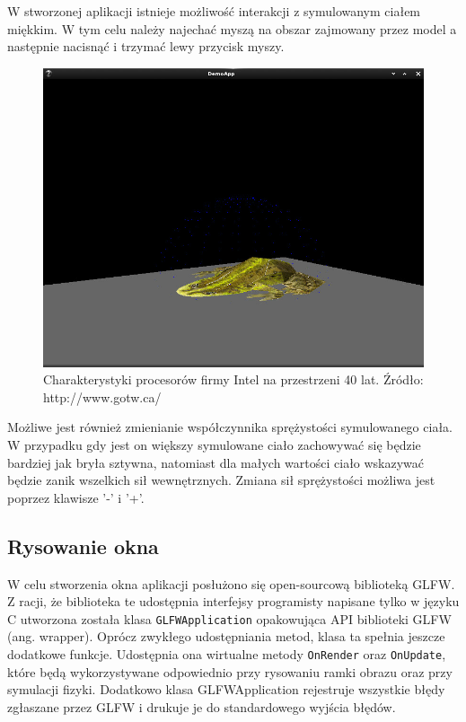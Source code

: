 W stworzonej aplikacji istnieje możliwość interakcji z symulowanym ciałem
miękkim. W tym celu należy najechać myszą na obszar zajmowany przez model a
następnie nacisnąć i trzymać lewy przycisk myszy.

\begin{figure}[H]
\centering
\includegraphics[scale=0.5]{images/z5.jpg}
\caption{Charakterystyki procesorów firmy Intel na przestrzeni 40 lat. Źródło: http://www.gotw.ca/}
\end{figure}

Możliwe jest również zmienianie współczynnika sprężystości symulowanego ciała. W
przypadku gdy jest on większy symulowane ciało zachowywać się będzie bardziej
jak bryła sztywna, natomiast dla małych wartości ciało wskazywać będzie zanik
wszelkich sił wewnętrznych. Zmiana sił sprężystości możliwa jest poprzez
klawisze '-' i '+'.

\subsection{Rysowanie okna}
W celu stworzenia okna aplikacji posłużono się open-sourcową biblioteką GLFW. Z
racji, że biblioteka te udostępnia interfejsy programisty napisane tylko w języku C
utworzona została klasa \texttt{GLFWApplication} opakowująca API biblioteki
GLFW (ang. wrapper). Oprócz zwykłego udostępniania metod, klasa ta spełnia
jeszcze dodatkowe funkcje. Udostępnia ona wirtualne metody \texttt{OnRender}
oraz \texttt{OnUpdate}, które będą wykorzystywane odpowiednio przy rysowaniu
ramki obrazu oraz przy symulacji fizyki. Dodatkowo klasa GLFWApplication rejestruje wszystkie błędy zgłaszane przez
GLFW i drukuje je do standardowego wyjścia błędów.

